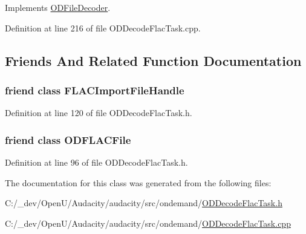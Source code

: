 Implements \hyperlink{class_o_d_file_decoder_a0aa7f2105d4a4f80871987b2ef2a484f}{O\+D\+File\+Decoder}.



Definition at line 216 of file O\+D\+Decode\+Flac\+Task.\+cpp.



\subsection{Friends And Related Function Documentation}
\subsubsection[{\texorpdfstring{F\+L\+A\+C\+Import\+File\+Handle}{FLACImportFileHandle}}]{\setlength{\rightskip}{0pt plus 5cm}friend class {\bf F\+L\+A\+C\+Import\+File\+Handle}\hspace{0.3cm}{\ttfamily [friend]}}\hypertarget{class_o_d_flac_decoder_a3600592937de6ccc937d5c906000647e}{}\label{class_o_d_flac_decoder_a3600592937de6ccc937d5c906000647e}


Definition at line 120 of file O\+D\+Decode\+Flac\+Task.\+h.

\subsubsection[{\texorpdfstring{O\+D\+F\+L\+A\+C\+File}{ODFLACFile}}]{\setlength{\rightskip}{0pt plus 5cm}friend class {\bf O\+D\+F\+L\+A\+C\+File}\hspace{0.3cm}{\ttfamily [friend]}}\hypertarget{class_o_d_flac_decoder_a64380c7f07eed2a1dc4a3c40c04c66b5}{}\label{class_o_d_flac_decoder_a64380c7f07eed2a1dc4a3c40c04c66b5}


Definition at line 96 of file O\+D\+Decode\+Flac\+Task.\+h.



The documentation for this class was generated from the following files\+:\begin{DoxyCompactItemize}
\item 
C\+:/\+\_\+dev/\+Open\+U/\+Audacity/audacity/src/ondemand/\hyperlink{_o_d_decode_flac_task_8h}{O\+D\+Decode\+Flac\+Task.\+h}\item 
C\+:/\+\_\+dev/\+Open\+U/\+Audacity/audacity/src/ondemand/\hyperlink{_o_d_decode_flac_task_8cpp}{O\+D\+Decode\+Flac\+Task.\+cpp}\end{DoxyCompactItemize}
